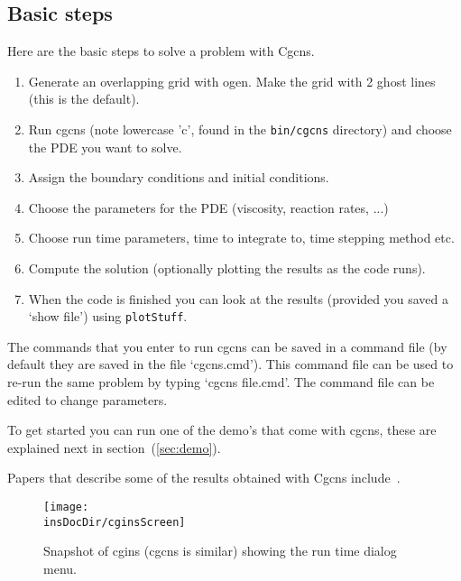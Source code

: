 \documentclass{article}
\newcommand{\Index}[1]{#1\index{#1}}
\newcommand{\insDocDir}{../ins}
\begin{document}
\subsection{Basic steps}
Here are the basic steps to solve a problem with Cgcns.
\begin{enumerate}
  \item Generate an overlapping grid with ogen. Make the grid with 2 ghost lines (this is the default).
  \item Run cgcns (note lowercase 'c', found in the {\tt bin/cgcns} directory) 
        and choose the PDE you want to solve.
  \item Assign the boundary conditions and initial conditions.
  \item Choose the parameters for the PDE (viscosity, reaction rates, ...)
  \item Choose run time parameters, time to integrate to, time stepping method etc.
  \item Compute the solution (optionally plotting the results as the code runs).
  \item When the code is finished you can look at the results (provided you saved a
     `show file') using {\tt plotStuff}.
\end{enumerate}
The commands that you enter to run cgcns can be saved in a \Index{command file} (by default
they are saved in the file `cgcns.cmd'). This command file can be used to re-run
the same problem by typing `cgcns file.cmd'. The command file can be edited to change parameters.

To get started you can run one of the demo's that come with cgcns, these are 
explained next in section~(\ref{sec:demo}).

Papers that describe some of the results obtained with Cgcns include~\cite{pog2008,mog2006,reactamr2003b}. 
  
\begin{figure}[hbt]
\begin{center}
  \texttt{[image: \\insDocDir/cginsScreen]} \\
  \caption{Snapshot of cgins (cgcns is similar) showing the run time dialog menu.}
  \end{center} 
  \label{fig:runTimeScreen}
\end{figure}


\clearpage

\end{document}
